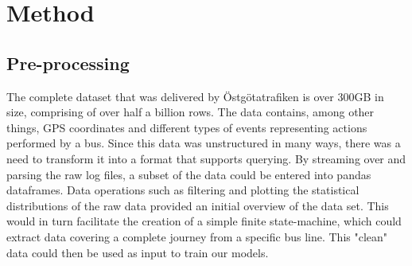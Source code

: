 
\chapter{Method}
\label{cha:method}

\section{Pre-processing}
\label{sec:pre-processing}
The complete dataset that was delivered by Östgötatrafiken is over 300GB in size, comprising of over half a billion rows. The data contains, among other things, GPS coordinates and different types of events representing actions performed by a bus. Since this data was unstructured in many ways, there was a need to transform it into a format that supports querying. By streaming over and parsing the raw log files, a subset of the data could be entered into pandas dataframes. Data operations such as filtering and plotting the statistical distributions of the raw data provided an initial overview of the data set. This would in turn facilitate the creation of a simple finite state-machine, which could extract data covering a complete journey from a specific bus line. This "clean" data could then be used as input to train our models.

